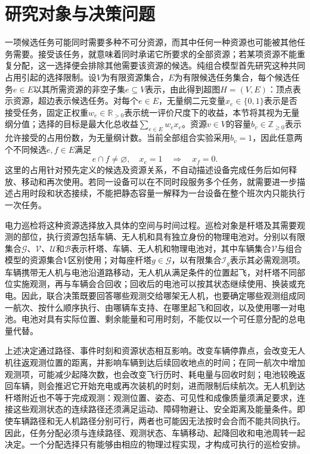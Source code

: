 \section{研究对象与决策问题}
\label{sec:01_01}

一项候选任务可能同时需要多种不可分资源，而其中任何一种资源也可能被其他任务需要。接受该任务，就意味着同时承诺它所要求的全部资源；若某项资源不能重复分配，这一选择便会排除其他需要该资源的候选。纯组合模型首先研究这种共同占用引起的选择限制。设$V$为有限资源集合，$E$为有限候选任务集合，每个候选任务$e\in E$以其所需资源的非空子集$e\subseteq V$表示，由此得到超图$H=(V,E)$：顶点表示资源，超边表示候选任务。对每个$e\in E$，无量纲二元变量$x_e\in\{0,1\}$表示是否接受任务，固定正权重$w_e\in\mathbb{R}_{>0}$表示统一评价尺度下的收益，本节将其视为无量纲分值；选择的目标是最大化总收益$\sum_{e\in E}w_ex_e$。资源$v\in V$的容量$b_v\in\mathbb{Z}_{\geq 0}$表示允许接受的占用份数，为无量纲计数。当前全部组合实验采用$b_v=1$，因此任意两个不同候选$e,f\in E$满足
\begin{equation}
 e\cap f\ne\varnothing,
 \quad x_e=1
 \quad\Longrightarrow\quad x_f=0.
 \label{s0101:shared_resource}
\end{equation}
这里的占用针对预先定义的候选及资源关系，不自动描述设备完成任务后如何释放、移动和再次使用。若同一设备可以在不同时段服务多个任务，就需要进一步描述占用时段和状态接续，不能把静态容量一解释为一台设备在整个班次内只能执行一次任务。

电力巡检将这种资源选择放入具体的空间与时间过程。巡检对象是杆塔及其需要观测的部位，执行资源包括车辆、无人机和具有独立身份的物理电池对。分别以有限集合$\mathcal{G}$、$\mathcal{V}$、$\mathcal{U}$和$\mathcal{B}$表示杆塔、车辆、无人机和物理电池对，其中车辆集合$\mathcal{V}$与组合模型的资源集合$V$区别使用；对每座杆塔$g\in\mathcal{G}$，以有限集合$\mathcal{I}_g$表示其必需观测项。车辆携带无人机与电池沿道路移动，无人机从满足条件的位置起飞，对杆塔不同部位实施观测，再与车辆会合回收；回收后的电池可以按其状态继续使用、换装或充电。因此，联合决策既要回答哪些观测交给哪架无人机，也要确定哪些观测组成同一航次、按什么顺序执行、由哪辆车支持、在哪里起飞和回收，以及使用哪一对电池。电池对具有实际位置、剩余能量和可用时刻，不能仅以一个可任意分配的总电量代替。

上述决定通过路径、事件时刻和资源状态相互影响。改变车辆停靠点，会改变无人机往返观测位置的距离，并影响车辆到达后续回收地点的时间；在同一航次中增加观测项，可能减少起降次数，也会改变飞行历时、耗电量与回收时刻；电池较晚返回车辆，则会推迟它开始充电或再次装机的时刻，进而限制后续航次。无人机到达杆塔附近也不等于完成观测：观测位置、姿态、可见性和成像质量须满足要求，连接这些观测状态的连续路径还须满足运动、障碍物避让、安全距离及能量条件。即使车辆路径和无人机路径分别可行，两者也可能因无法按时会合而不能共同执行。因此，任务分配必须与连续路径、观测状态、车辆移动、起降回收和电池周转一起决定。一个分配选择只有能够由相应的物理过程实现，才构成可执行的巡检安排。

